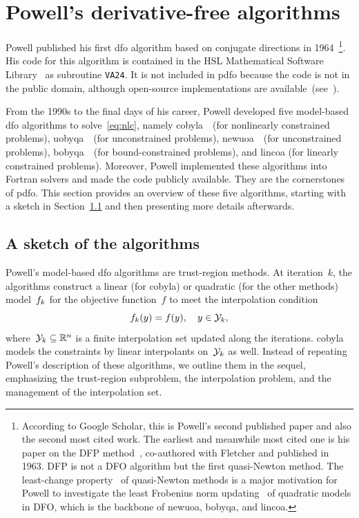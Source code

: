 \documentclass[
    smallextended,  %
    final,        %
]{svjour3}
\newcommand{\R}{\mathbb{R}}
\newcommand{\objm}[1][k]{\obj\ifthenelse{\equal{#1}{}}{}{_{#1}}}
\newcommand{\obj}{f}
\newcommand{\xpt}[1][k]{\mathcal{Y}\ifthenelse{\equal{#1}{}}{}{_{#1}}}
\begin{document}
\section{Powell's derivative-free algorithms}
\label{sec:powell}

Powell published his first \gls{dfo} algorithm based on conjugate directions in 1964~\cite{Powell_1964}\footnote{According to Google Scholar, this is Powell's second published paper and also the second most cited work.
The earliest and meanwhile most cited one is his paper on the DFP method~\cite{Fletcher_Powell_1963},
co-authored with Fletcher and published in 1963. DFP is not a DFO algorithm but the first
quasi-Newton method. The least-change property~\cite{Dennis_Schnabel_1979} of quasi-Newton methods
is a major motivation for Powell to investigate the least Frobenius norm updating~\cite{Powell_2004b}
of quadratic models in DFO, which is the backbone of \gls{newuoa}, \gls{bobyqa}, and \gls{lincoa}.}.
His code for this algorithm is contained in the HSL Mathematical Software Library~\cite{HSL} as subroutine \texttt{VA24}.
It is not included in \gls{pdfo} because the code is not in the public domain, although open-source implementations are available~(see~\cite[footnote~4]{Conn_Scheinberg_Toint_1997b}).

From the 1990s to the final days of his career, Powell developed five model-based \gls{dfo}
algorithms to solve~\eqref{eq:nlc}, namely \gls{cobyla}~\cite{Powell_1994}~(for nonlinearly
constrained problems), \gls{uobyqa}~\cite{Powell_2002}~(for unconstrained problems),
\gls{newuoa}~\cite{Powell_2006}~(for unconstrained problems), \gls{bobyqa}~\cite{Powell_2009}~(for
bound-constrained problems), and \gls{lincoa} (for linearly constrained problems).
Moreover, Powell implemented these algorithms into Fortran solvers and made the code publicly available.
They are the cornerstones of \gls{pdfo}.
This section provides an overview of these five algorithms, starting with a sketch in
Section~\ref{ssec:sketch} and then presenting more details afterwards.

\subsection{A sketch of the algorithms}
\label{ssec:sketch}

Powell's model-based \gls{dfo} algorithms are trust-region methods.
At iteration~$k$, the algorithms construct a linear (for \gls{cobyla}) or quadratic (for the other methods) model~$\objm$ for the objective function~$f$ to meet the interpolation condition
\begin{equation}
    \label{eq:itpls}
    \objm(y) = \obj(y), \quad y \in \xpt,
\end{equation}
where~$\xpt \subseteq \R^n$ is a finite interpolation set updated along the iterations.
\Gls{cobyla} models the constraints by linear interpolants on~$\xpt$ as well.
Instead of repeating Powell's description of these algorithms, we outline them in the sequel, emphasizing the trust-region subproblem, the interpolation problem, and the management of the interpolation set.
\end{document}

